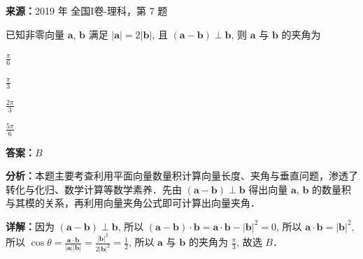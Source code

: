 \begin{question}[points=5]
\textbf{来源：}2019 年 全国I卷-理科，第 7 题\par
已知非零向量 $\mathbf{a}$, $\mathbf{b}$ 满足 $|\mathbf{a}| = 2|\mathbf{b}|$, 且 $(\mathbf{a} - \mathbf{b}) \perp \mathbf{b}$, 则 $\mathbf{a}$ 与 $\mathbf{b}$ 的夹角为
\begin{choices}
  \item $\frac{\pi}{6}$
  \item $\frac{\pi}{3}$
  \item $\frac{2\pi}{3}$
  \item $\frac{5\pi}{6}$
\end{choices}
\begin{solution}
\textbf{答案：}$B$

\textbf{分析：}本题主要考查利用平面向量数量积计算向量长度、夹角与垂直问题，渗透了转化与化归、数学计算等数学素养．先由 $(\mathbf{a} - \mathbf{b}) \perp \mathbf{b}$ 得出向量 $\mathbf{a}$, $\mathbf{b}$ 的数量积与其模的关系，再利用向量夹角公式即可计算出向量夹角．

\textbf{详解：}因为 $(\mathbf{a} - \mathbf{b}) \perp \mathbf{b}$, 所以 $(\mathbf{a} - \mathbf{b}) \cdot \mathbf{b} = \mathbf{a} \cdot \mathbf{b} - |\mathbf{b}|^2 = 0$, 所以 $\mathbf{a} \cdot \mathbf{b} = |\mathbf{b}|^2$, 所以 $\cos \theta = \frac{\mathbf{a} \cdot \mathbf{b}}{|\mathbf{a}| |\mathbf{b}|} = \frac{|\mathbf{b}|^2}{2|\mathbf{b}|^2} = \frac{1}{2}$, 所以 $\mathbf{a}$ 与 $\mathbf{b}$ 的夹角为 $\frac{\pi}{3}$, 故选 $B$．
\end{solution}
\end{question}

